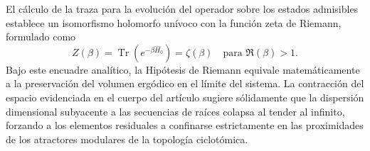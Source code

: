 \documentclass{article}
\numberwithin{equation}{section}
\theoremstyle{plain}
\theoremstyle{definition}
\begin{document}
El cálculo de la traza para la evolución del operador sobre los estados admisibles establece un isomorfismo holomorfo unívoco con la función zeta de Riemann, formulado como
\begin{equation}
    Z(\beta) = \operatorname{Tr}(e^{-\beta \hat{H}_0}) = \zeta(\beta) \quad \text{para } \Re(\beta) > 1.
\end{equation}
Bajo este encuadre analítico, la Hipótesis de Riemann equivale matemáticamente a la preservación del volumen ergódico en el límite del sistema. La contracción del espacio evidenciada en el cuerpo del artículo sugiere sólidamente que la dispersión dimensional subyacente a las secuencias de raíces colapsa al tender al infinito, forzando a los elementos residuales a confinarse estrictamente en las proximidades de los atractores modulares de la topología ciclotómica.
\end{document}
